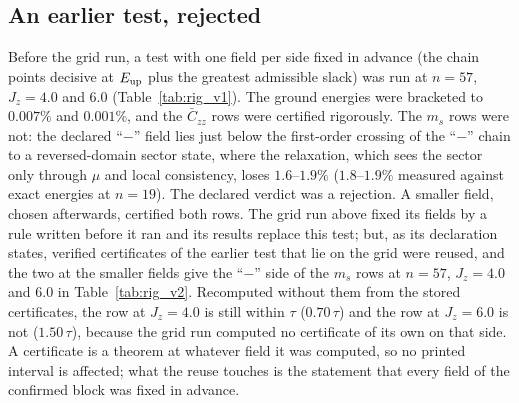 \documentclass[aps,prx,onecolumn,10pt,nofootinbib,longbibliography,floatfix]{revtex4-2}
\theoremstyle{remark}
\newcommand{\Jz}{J_z}
\newcommand{\ms}{m_s}
\newcommand{\Czz}{\bar C_{zz}}
\begin{document}
\subsection{An earlier test, rejected}
Before the grid run, a test with one field per side fixed in advance (the chain points decisive at $E_{\rm up}$ plus
the greatest admissible slack) was run at $n=57$, $\Jz=4.0$ and $6.0$ (Table~\ref{tab:rig_v1}). The ground energies %
were bracketed to $0.007\%$ and $0.001\%$, and the $\Czz$ rows were certified rigorously. The $\ms$ rows were not: the %
declared ``$-$'' field lies just below the first-order crossing of the ``$-$'' chain to a reversed-domain sector state,
where the relaxation, which sees the sector only through $\mu$ and local consistency, loses $1.6$--$1.9\%$ ($1.8$--$1.9\%$ %
measured against exact energies at $n=19$). The declared verdict was a rejection. A smaller field, chosen afterwards, %
certified both rows. The grid run above fixed its fields by a rule written before it ran and its results replace
this test; but, as its declaration states, verified certificates of the earlier test that lie on the grid were
reused, and the two at the smaller fields give the ``$-$'' side of the $\ms$ rows at $n=57$, $\Jz=4.0$ and $6.0$ in
Table~\ref{tab:rig_v2}. Recomputed without them from the stored certificates, the row at $\Jz=4.0$ is still within
$\tau$ ($0.70\,\tau$) and the row at $\Jz=6.0$ is not ($1.50\,\tau$), because the grid run computed no certificate of %
its own on that side. A certificate is a theorem at whatever field it was computed, so no printed interval is
affected; what the reuse touches is the statement that every field of the confirmed block was fixed in advance.

\def\SMcap{The earlier rigorous test ($n=57$, one declared field per side). Ground energy: DMRG value and verified %
lower bound (units of the exchange coupling), slack in absolute and relative terms. Labels: slack of each side,
the declared ratio $\rho$ of slack to the slack the row needed ($\rho\ge3$: rejection), and the rigorous width at %
$E_{\rm up}$ over $\tau$. The $\ms$ ``$-$'' fields sit next to a level crossing.}\def\SMlab{tab:rig_v1} %

\end{document}
